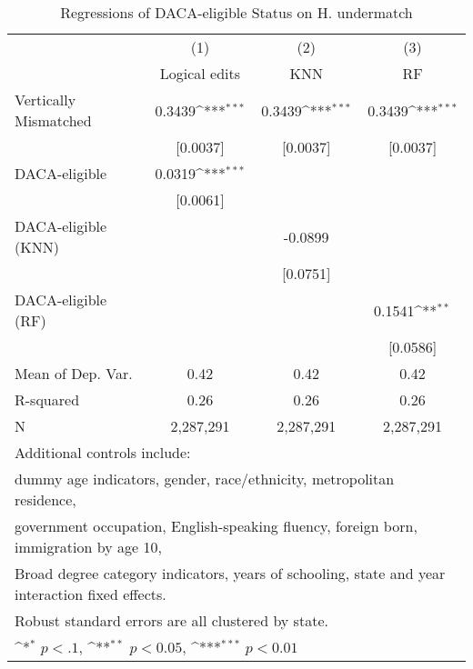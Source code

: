 \begin{table}[htbp]\centering
\def\sym#1{\ifmmode^{#1}\else\(^{#1}\)\fi}
\caption{Regressions of DACA-eligible Status on H. undermatch}
\begin{tabular}{l*{3}{c}}
\toprule
                    &\multicolumn{1}{c}{(1)}         &\multicolumn{1}{c}{(2)}         &\multicolumn{1}{c}{(3)}         \\
                    &Logical edits         &         KNN         &          RF         \\
\midrule
Vertically Mismatched&      0.3439\sym{***}&      0.3439\sym{***}&      0.3439\sym{***}\\
                    &    [0.0037]         &    [0.0037]         &    [0.0037]         \\
\addlinespace
DACA-eligible       &      0.0319\sym{***}&                     &                     \\
                    &    [0.0061]         &                     &                     \\
\addlinespace
DACA-eligible (KNN) &                     &     -0.0899         &                     \\
                    &                     &    [0.0751]         &                     \\
\addlinespace
DACA-eligible (RF)  &                     &                     &      0.1541\sym{**} \\
                    &                     &                     &    [0.0586]         \\
\midrule
Mean of Dep. Var.   &        0.42         &        0.42         &        0.42         \\
R-squared           &        0.26         &        0.26         &        0.26         \\
N                   &   2,287,291         &   2,287,291         &   2,287,291         \\
\bottomrule
\multicolumn{4}{l}{\footnotesize Additional controls include:}\\
\multicolumn{4}{l}{\footnotesize dummy age indicators, gender, race/ethnicity, metropolitan residence,}\\
\multicolumn{4}{l}{\footnotesize government occupation, English-speaking fluency, foreign born, immigration by age 10,}\\
\multicolumn{4}{l}{\footnotesize Broad degree category indicators, years of schooling, state and year interaction fixed effects.}\\
\multicolumn{4}{l}{\footnotesize Robust standard errors are all clustered by state.}\\
\multicolumn{4}{l}{\footnotesize \sym{*} \(p<.1\), \sym{**} \(p<0.05\), \sym{***} \(p<0.01\)}\\
\end{tabular}
\end{table}
